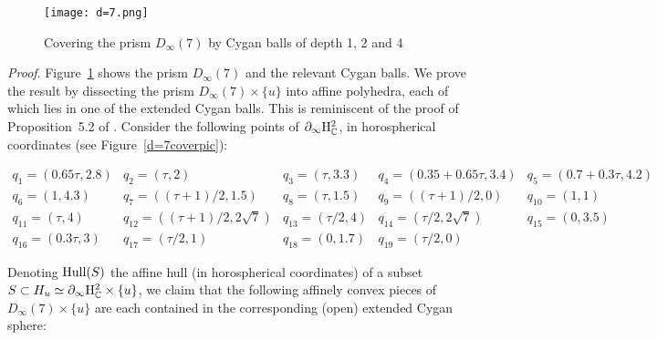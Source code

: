 \documentclass{article}[12pt]
\newcommand{\C}{\mathbb{C}}
\newcommand{\Pf}{{\em Proof}. }
\begin{document}
\begin{center}
\begin{figure}\label{d=7pic}
\caption{Covering the prism $D_\infty (7)$ by Cygan balls of depth 1, 2 and 4}
\texttt{[image: d=7.png]}
\end{figure}
  \end{center}
 
\Pf Figure~\ref{d=7pic} shows the prism $D_\infty(7)$ and the relevant Cygan balls. We prove the result by dissecting the prism $D_\infty(7)\times \{ u \}$ into affine polyhedra, each of which lies in one of the extended Cygan balls. This is reminiscent of the proof of Proposition~5.2 of \cite{Zh}. Consider the following points of $\partial_\infty {\rm H}_\C^2$, in horospherical coordinates (see Figure~\ref{d=7coverpic}):

$$\begin{array}{ccccc}
  q_1=(0.65\tau,2.8) & q_2=(\tau,2) & q_3=(\tau,3.3) & q_4=(0.35+0.65\tau,3.4) & q_5=(0.7+0.3\tau,4.2) \\
  q_6=(1,4.3) & q_7=((\tau +1)/2,1.5) & q_8=(\tau,1.5) & q_9=((\tau +1)/2,0) & q_{10}=(1,1) \\
  q_{11}=(\tau,4) & q_{12}=((\tau +1)/2,2\sqrt{7}) & q_{13}=(\tau/2,4) & q_{14}=(\tau/2,2\sqrt{7}) & q_{15}=(0,3.5) \\
  q_{16}=(0.3\tau,3) & q_{17}=(\tau/2,1) & q_{18}=(0,1.7) & q_{19}=(\tau/2,0) &
\end{array}
$$

Denoting ${\rm Hull}(S)$ the affine hull (in horospherical coordinates) of a subset $S \subset H_u \simeq \partial_\infty {\rm H}_\C^2 \times \{ u \}$, we claim that the following affinely convex pieces of $D_\infty(7)\times \{ u \}$ are each contained in the corresponding (open) extended Cygan sphere:
\end{document}
